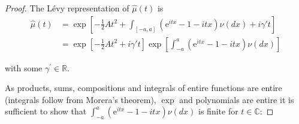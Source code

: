 \documentclass[a4paper,11pt]{article}
\begin{document}
\begin{proof}
    The Lévy representation of $\widehat{\mu}(t)$ is
    \begin{align}
        \widehat{\mu}(t) & =\exp \left[-\frac{1}{2}At^{2} +\int_{[-a, a]}\left(\mathrm{e}^{i tx}-1-itx\right) \nu(dx)+i \gamma't \right]                  \\
                         & =\exp \left[-\frac{1}{2}At^{2}+i \gamma't \right] \exp \left[\int_{-a}^{a}\left(\mathrm{e}^{i tx}-1-itx\right) \nu(dx) \right]
    \end{align}

    with some $\gamma^{\prime} \in \mathbb{R}$.

    As products, sums, compositions and integrals of entire functions are entire (integrals follow from Morera's theorem), $\exp$ and polynomials are entire it is sufficient to show that $\int_{-a}^{a}\left(\mathrm{e}^{i tx}-1-itx\right) \nu(dx)$ is finite for $t \in \mathbb{C}$:


\end{proof}
\end{document}
